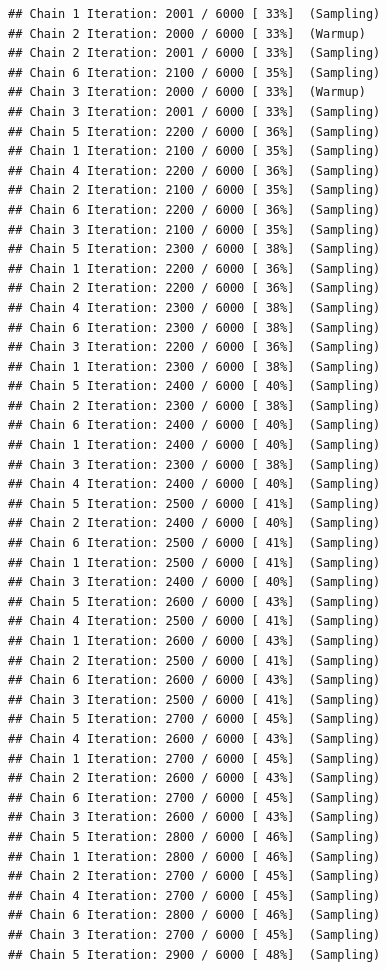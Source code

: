 \documentclass[
]{article}
\begin{document}
\begin{verbatim}
## Chain 1 Iteration: 2001 / 6000 [ 33%]  (Sampling) 
## Chain 2 Iteration: 2000 / 6000 [ 33%]  (Warmup) 
## Chain 2 Iteration: 2001 / 6000 [ 33%]  (Sampling) 
## Chain 6 Iteration: 2100 / 6000 [ 35%]  (Sampling) 
## Chain 3 Iteration: 2000 / 6000 [ 33%]  (Warmup) 
## Chain 3 Iteration: 2001 / 6000 [ 33%]  (Sampling) 
## Chain 5 Iteration: 2200 / 6000 [ 36%]  (Sampling) 
## Chain 1 Iteration: 2100 / 6000 [ 35%]  (Sampling) 
## Chain 4 Iteration: 2200 / 6000 [ 36%]  (Sampling) 
## Chain 2 Iteration: 2100 / 6000 [ 35%]  (Sampling) 
## Chain 6 Iteration: 2200 / 6000 [ 36%]  (Sampling) 
## Chain 3 Iteration: 2100 / 6000 [ 35%]  (Sampling) 
## Chain 5 Iteration: 2300 / 6000 [ 38%]  (Sampling) 
## Chain 1 Iteration: 2200 / 6000 [ 36%]  (Sampling) 
## Chain 2 Iteration: 2200 / 6000 [ 36%]  (Sampling) 
## Chain 4 Iteration: 2300 / 6000 [ 38%]  (Sampling) 
## Chain 6 Iteration: 2300 / 6000 [ 38%]  (Sampling) 
## Chain 3 Iteration: 2200 / 6000 [ 36%]  (Sampling) 
## Chain 1 Iteration: 2300 / 6000 [ 38%]  (Sampling) 
## Chain 5 Iteration: 2400 / 6000 [ 40%]  (Sampling) 
## Chain 2 Iteration: 2300 / 6000 [ 38%]  (Sampling) 
## Chain 6 Iteration: 2400 / 6000 [ 40%]  (Sampling) 
## Chain 1 Iteration: 2400 / 6000 [ 40%]  (Sampling) 
## Chain 3 Iteration: 2300 / 6000 [ 38%]  (Sampling) 
## Chain 4 Iteration: 2400 / 6000 [ 40%]  (Sampling) 
## Chain 5 Iteration: 2500 / 6000 [ 41%]  (Sampling) 
## Chain 2 Iteration: 2400 / 6000 [ 40%]  (Sampling) 
## Chain 6 Iteration: 2500 / 6000 [ 41%]  (Sampling) 
## Chain 1 Iteration: 2500 / 6000 [ 41%]  (Sampling) 
## Chain 3 Iteration: 2400 / 6000 [ 40%]  (Sampling) 
## Chain 5 Iteration: 2600 / 6000 [ 43%]  (Sampling) 
## Chain 4 Iteration: 2500 / 6000 [ 41%]  (Sampling) 
## Chain 1 Iteration: 2600 / 6000 [ 43%]  (Sampling) 
## Chain 2 Iteration: 2500 / 6000 [ 41%]  (Sampling) 
## Chain 6 Iteration: 2600 / 6000 [ 43%]  (Sampling) 
## Chain 3 Iteration: 2500 / 6000 [ 41%]  (Sampling) 
## Chain 5 Iteration: 2700 / 6000 [ 45%]  (Sampling) 
## Chain 4 Iteration: 2600 / 6000 [ 43%]  (Sampling) 
## Chain 1 Iteration: 2700 / 6000 [ 45%]  (Sampling) 
## Chain 2 Iteration: 2600 / 6000 [ 43%]  (Sampling) 
## Chain 6 Iteration: 2700 / 6000 [ 45%]  (Sampling) 
## Chain 3 Iteration: 2600 / 6000 [ 43%]  (Sampling) 
## Chain 5 Iteration: 2800 / 6000 [ 46%]  (Sampling) 
## Chain 1 Iteration: 2800 / 6000 [ 46%]  (Sampling) 
## Chain 2 Iteration: 2700 / 6000 [ 45%]  (Sampling) 
## Chain 4 Iteration: 2700 / 6000 [ 45%]  (Sampling) 
## Chain 6 Iteration: 2800 / 6000 [ 46%]  (Sampling) 
## Chain 3 Iteration: 2700 / 6000 [ 45%]  (Sampling) 
## Chain 5 Iteration: 2900 / 6000 [ 48%]  (Sampling) 

\end{verbatim}
\end{document}
